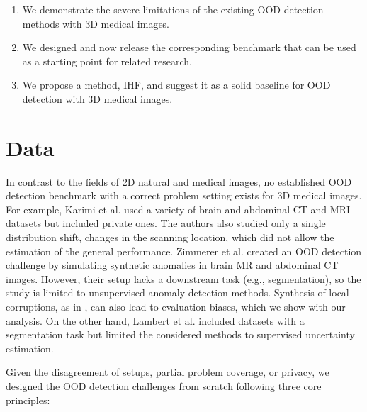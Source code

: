 \begin{enumerate}	
	\item We demonstrate the severe limitations of the existing OOD detection methods with 3D medical images.%
	\item We designed and now release the corresponding benchmark that can be used as a starting point for related research. %
	\item We propose a method, IHF, and suggest it as a solid baseline for OOD detection with 3D medical images.%
\end{enumerate}



\section{Data}

In contrast to the fields of 2D natural and medical images, no established OOD detection benchmark with a correct problem setting exists for 3D medical images. For example, Karimi et al. \cite{karimi2022improving} used a variety of brain and abdominal CT and MRI datasets but included private ones. The authors also studied only a single distribution shift, changes in the scanning location, which did not allow the estimation of the general performance. Zimmerer et al. \cite{david_zimmerer_2022_6362313} created an OOD detection challenge by simulating synthetic anomalies in brain MR and abdominal CT images. However, their setup lacks a downstream task (e.g., segmentation), so the study is limited to unsupervised anomaly detection methods. Synthesis of local corruptions, as in \cite{david_zimmerer_2022_6362313}, can also lead to evaluation biases, which we show with our analysis. On the other hand, Lambert et al. \cite{lambert2022improving} included datasets with a segmentation task but limited the considered methods to supervised uncertainty estimation.

Given the disagreement of setups, partial problem coverage, or privacy, we designed the OOD detection challenges from scratch following three core principles:

